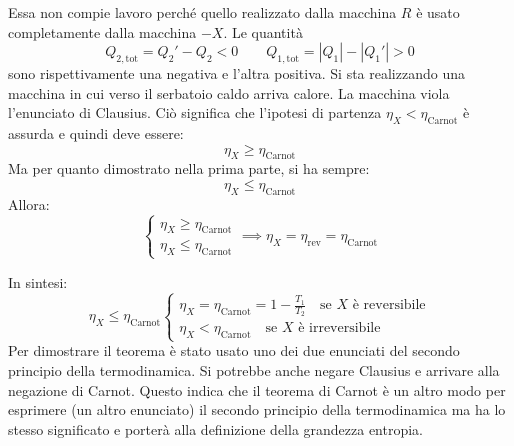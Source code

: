 \documentclass[10pt,a4paper]{book}
\begin{document}
\begin{figure}[htpb]
\end{figure}
\FloatBarrier
Essa non compie lavoro perché quello realizzato dalla macchina $R$ è usato completamente dalla macchina $-X$. Le quantità
\[
	Q_{2,\text{tot} } = Q_2' - Q_2 < 0 \qquad Q_{1,\text{tot} } = |Q_1| - |Q_1'| > 0
\]
sono rispettivamente una negativa e l'altra positiva. Si sta realizzando una macchina in cui verso il serbatoio caldo arriva calore. La macchina viola l'enunciato di Clausius. Ciò significa che l'ipotesi di partenza $\eta_X< \eta_{\text{Carnot}}$ è assurda e quindi deve essere:
\[
	\eta_X \geq \eta_{\text{Carnot}}
\]
Ma per quanto dimostrato nella prima parte, si ha sempre:
\[
	\eta_X \leq \eta_{\text{Carnot}}
\]
Allora:
\[
	\left\{ \begin{array}{r}
	 	\eta_X \geq \eta_{\text{Carnot}} \\
		\eta_X \leq \eta_{\text{Carnot}}
	\end{array} \right.
	\implies \boxed{\eta_X = \eta_{\text{rev}} = \eta_{\text{Carnot}}}
\]

In sintesi:
\[
	\boxed{\eta_X \le \eta_{\text{Carnot} }\left\{ \begin{array}{l}
	 	\eta_X = \eta_{\text{Carnot} } = 1 - \frac{T_1 }{T_2 }\quad \text{se }X\text{ è reversibile} \\
		\eta_X < \eta_{\text{Carnot} } \quad \text{se }X\text{ è irreversibile}
	\end{array} \right.}
\]
Per dimostrare il teorema è stato usato uno dei due enunciati del secondo principio della termodinamica. Si potrebbe anche negare Clausius e arrivare alla negazione di Carnot. Questo indica che il teorema di Carnot è un altro modo per esprimere (un altro enunciato) il secondo principio della termodinamica ma ha lo stesso significato e porterà alla definizione della grandezza entropia.
\end{document}
